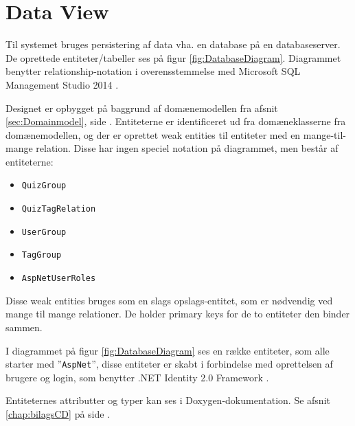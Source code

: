\section{Data View}

Til systemet bruges persistering af data vha. en database på en databaseserver. De oprettede entiteter/tabeller ses på figur \ref{fig:DatabaseDiagram}. Diagrammet benytter relationship-notation i overensstemmelse med Microsoft SQL Management Studio 2014 \citep{netidentityWeb}.

Designet er opbygget på baggrund af domænemodellen fra afsnit \ref{sec:Domainmodel}, side \pageref{sec:Domainmodel}. Entiteterne er identificeret ud fra domæneklasserne fra domænemodellen, og der er oprettet weak entities til entiteter med en mange-til-mange relation. Disse har ingen speciel notation på diagrammet, men består af entiteterne:

\begin{itemize}
	\item\verb+QuizGroup+
	\item\verb+QuizTagRelation+
	\item\verb+UserGroup+
	\item\verb+TagGroup+
	\item\verb+AspNetUserRoles+
\end{itemize}

Disse weak entities bruges som en slags opslags-entitet, som er nødvendig ved mange til mange relationer. De holder primary keys for de to entiteter den binder sammen.

I diagrammet på figur \ref{fig:DatabaseDiagram} ses en række entiteter, som alle starter med ''\verb+AspNet+'', disse entiteter er skabt i forbindelse med oprettelsen af brugere og login, som benytter .NET Identity 2.0 Framework \citep{netidentityWeb}.


Entiteternes attributter og typer kan ses i Doxygen-dokumentation. Se afsnit \ref{chap:bilagsCD} på side \pageref{chap:bilagsCD}.
